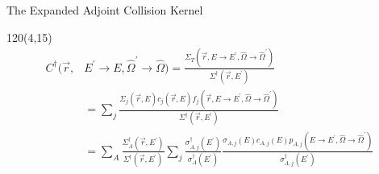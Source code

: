 \documentclass{beamer}
\begin{document}
\begin{frame}{The Expanded Adjoint Collision Kernel}
  
  \begin{textblock}{120}(4,15)
    \begin{align}
      C^{\dagger}(\vec{r},&E^{'} \to E,\hat{\Omega}^{'} \to \hat{\Omega}) =
      \frac{\Sigma_T(\vec{r},E \to E^{'},\hat{\Omega} \to \hat{\Omega}^{'})}
           {\Sigma^{\dagger}(\vec{r},E^{'})} \nonumber \\
           & = \sum_j 
           \frac{\Sigma_{j}(\vec{r},E)c_j(\vec{r},E)
             f_j(\vec{r},E \to E^{'},\hat{\Omega} \to \hat{\Omega}^{'})}
                {\Sigma^{\dagger}(\vec{r},E^{'})} \nonumber \\
                & = \sum_A \frac{\Sigma_A^{\dagger}(\vec{r},E^{'})}
                {\Sigma^{\dagger}(\vec{r},E^{'})}
                \sum_j \frac{\sigma_{A,j}^{\dagger}(E^{'})}{\sigma_A^{\dagger}(E^{'})}
                \frac{\sigma_{A,j}(E) c_{A,j}(E) 
                  p_{A,j}(E \to E^{'},\hat{\Omega} \to \hat{\Omega}^{'})}
                     {\sigma_{A,j}^{\dagger}(E^{'})} \nonumber
    \end{align}
  \end{textblock}



\end{frame}
\end{document}

